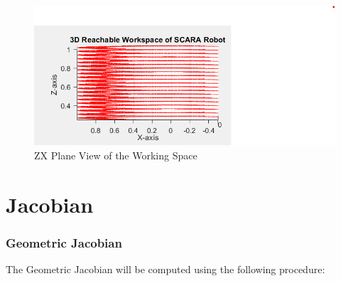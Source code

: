 \documentclass[12pt]{report}
\begin{document}
\begin{figure}[H]
	\centering
	\includegraphics[scale=1]{W3} %
	\caption{ZX Plane View of the Working Space}
	\label{W3} %
\end{figure}

	\chapter{Jacobian}
		\addtocounter{section}{3} 
			\addtocounter{subsection}{0}
	\subsection{Geometric Jacobian}
	The Geometric Jacobian will be computed using the following procedure:
	
\end{document}
